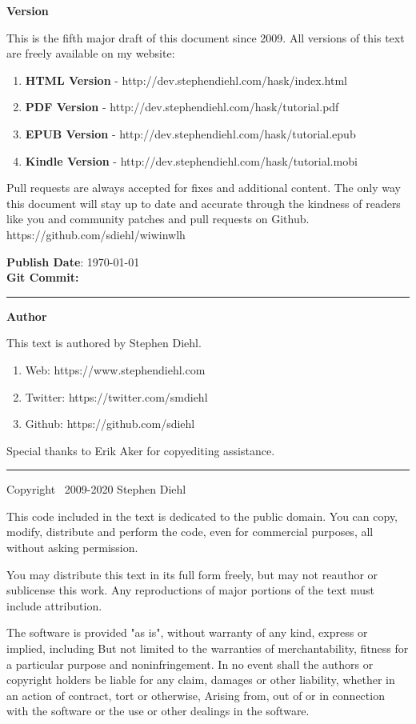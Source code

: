 \Large\textbf{Version}
\normalsize

This is the fifth major draft of this document since 2009. All versions of this
text are freely available on my website:

\begin{enumerate}
\item \textbf{HTML Version}   - http://dev.stephendiehl.com/hask/index.html
\item \textbf{PDF Version}    - http://dev.stephendiehl.com/hask/tutorial.pdf
\item \textbf{EPUB Version}   - http://dev.stephendiehl.com/hask/tutorial.epub
\item \textbf{Kindle Version} - http://dev.stephendiehl.com/hask/tutorial.mobi
\end{enumerate}

Pull requests are always accepted for fixes and additional content.  The only
way this document will stay up to date and accurate through the kindness of
readers like you and community patches and pull requests on Github.
https://github.com/sdiehl/wiwinwlh

\textbf{Publish Date}: \today \\
\textbf{Git Commit:} \texttt{}

\par\noindent\rule{\textwidth}{0.4pt}

\Large\textbf{Author}
\normalsize

This text is authored by Stephen Diehl.

\begin{enumerate}
\item Web: https://www.stephendiehl.com
\item Twitter: https://twitter.com/smdiehl
\item Github: https://github.com/sdiehl
\end{enumerate}

Special thanks to Erik Aker for copyediting assistance.

\par\noindent\rule{\textwidth}{0.4pt}

Copyright \textcopyright \ 2009-2020 Stephen Diehl

This code included in the text is dedicated to the public domain.  You can copy,
modify, distribute and perform the code, even for commercial purposes, all
without asking permission.

You may distribute this text in its full form freely, but may not reauthor or
sublicense this work. Any reproductions of major portions of the text must
include attribution.

The software is provided "as is", without warranty of any kind, express or
implied, including But not limited to the warranties of merchantability, fitness
for a particular purpose and noninfringement. In no event shall the authors or
copyright holders be liable for any claim, damages or other liability, whether
in an action of contract, tort or otherwise, Arising from, out of or in
connection with the software or the use or other dealings in the software.
